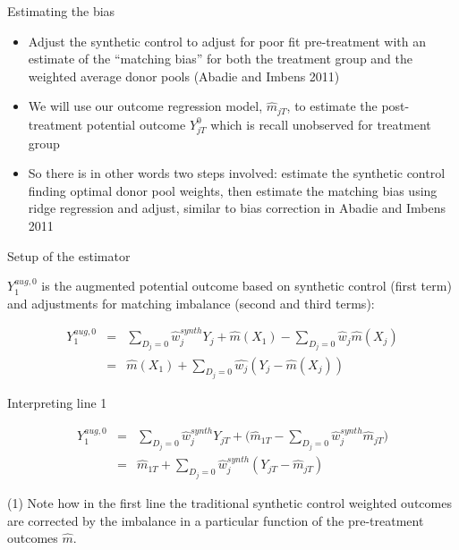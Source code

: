 \documentclass{beamer}
\begin{document}
\begin{frame}{Estimating the bias}

\begin{itemize}
\item Adjust the synthetic control to adjust for poor fit pre-treatment with an estimate of the ``matching bias'' for both the treatment group and the weighted average donor pools (Abadie and Imbens 2011)
\item We will use our outcome regression model, $\widehat{m}_{jT}$, to estimate the post-treatment potential outcome $Y_{jT}^0$ which is recall unobserved for treatment group
\item So there is in other words two steps involved: estimate the synthetic control finding optimal donor pool weights, then estimate the matching bias using ridge regression and adjust, similar to bias correction in Abadie and Imbens 2011
\end{itemize}


\end{frame}




\begin{frame}{Setup of the estimator}

$Y_1^{aug,0}$ is the augmented potential outcome based on synthetic control (first term) and adjustments for matching imbalance (second and third terms):

\begin{eqnarray*}
Y_1^{aug,0} &=& \sum_{D_j=0} \widehat{w}_j^{synth} Y_{j} + \widehat{m}(X_1) - \sum_{D_j=0} \widehat{w}_j \widehat{m}(X_j) \\
&=& \widehat{m}(X_1) + \sum_{D_j=0} \widehat{w_j}(Y_j - \widehat{m}(X_j))
\end{eqnarray*}

\end{frame}


\begin{frame}{Interpreting line 1}

\begin{eqnarray*}
Y_1^{aug,0} &=& \sum_{D_j=0} \widehat{w}_j^{synth} Y_{jT} + \bigg (\widehat{m}_{1T} - \sum_{D_j=0} \widehat{w}_j^{synth}\widehat{m}_{jT} \bigg ) \\
&=& \widehat{m}_{1T} + \sum_{D_j=0} \widehat{w}_j^{synth} (Y_{jT} - \widehat{m}_{jT})
\end{eqnarray*}

(1) Note how in the first line the traditional synthetic control weighted outcomes are corrected by the imbalance in a particular function of the pre-treatment outcomes $\widehat{m}$. 
\end{frame}
\end{document}
